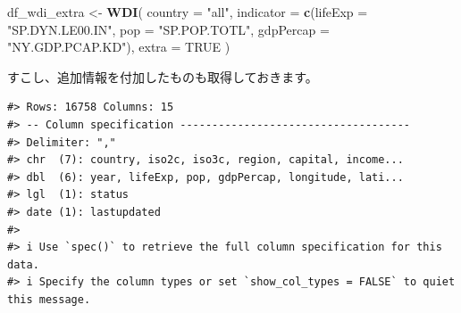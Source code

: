 \documentclass[
  xelatex, ja=standard]{bxjsbook}
\newenvironment{Shaded}{\begin{snugshade}}{\end{snugshade}}
\newcommand{\AttributeTok}[1]{\textcolor[rgb]{0.13,0.29,0.53}{#1}}
\newcommand{\ConstantTok}[1]{\textcolor[rgb]{0.56,0.35,0.01}{#1}}
\newcommand{\FunctionTok}[1]{\textcolor[rgb]{0.13,0.29,0.53}{\textbf{#1}}}
\newcommand{\NormalTok}[1]{#1}
\newcommand{\OtherTok}[1]{\textcolor[rgb]{0.56,0.35,0.01}{#1}}
\newcommand{\StringTok}[1]{\textcolor[rgb]{0.31,0.60,0.02}{#1}}
\theoremstyle{definition}
\theoremstyle{definition}
\theoremstyle{definition}
\theoremstyle{definition}
\theoremstyle{remark}
\begin{document}
\begin{Shaded}
\begin{Highlighting}[]
\NormalTok{df\_wdi\_extra }\OtherTok{\textless{}{-}} \FunctionTok{WDI}\NormalTok{(}
  \AttributeTok{country =} \StringTok{"all"}\NormalTok{, }
  \AttributeTok{indicator =} \FunctionTok{c}\NormalTok{(}\AttributeTok{lifeExp =} \StringTok{"SP.DYN.LE00.IN"}\NormalTok{, }\AttributeTok{pop =} \StringTok{"SP.POP.TOTL"}\NormalTok{, }\AttributeTok{gdpPercap =} \StringTok{"NY.GDP.PCAP.KD"}\NormalTok{), }
  \AttributeTok{extra =} \ConstantTok{TRUE}
\NormalTok{)}
\end{Highlighting}
\end{Shaded}

すこし、追加情報を付加したものも取得しておきます。

\begin{verbatim}
#> Rows: 16758 Columns: 15
#> -- Column specification ------------------------------------
#> Delimiter: ","
#> chr  (7): country, iso2c, iso3c, region, capital, income...
#> dbl  (6): year, lifeExp, pop, gdpPercap, longitude, lati...
#> lgl  (1): status
#> date (1): lastupdated
#> 
#> i Use `spec()` to retrieve the full column specification for this data.
#> i Specify the column types or set `show_col_types = FALSE` to quiet this message.
\end{verbatim}
\end{document}
